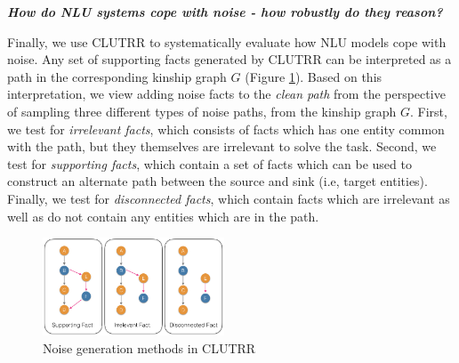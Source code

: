 \documentclass[12pt]{article}
\newcommand{\xhdr}[1]{{\noindent\bfseries #1}.}
\newcommand{\xit}[1]{{\noindent\textbf{\textit{#1}}}}
\begin{document}




\xit{How do NLU systems cope with noise - how robustly do they reason?}

Finally, we use CLUTRR to systematically evaluate how NLU models cope with noise.
Any set of supporting facts generated by CLUTRR can be interpreted as a path in the corresponding kinship graph $G$ (Figure \ref{fig:clutrr_data_noise}).
Based on this interpretation, we view adding noise facts to the \textit{clean path} from the perspective of sampling three different types of noise paths, from the kinship graph $G$. First, we test for \textit{irrelevant facts}, which consists of facts which has one entity common with the path, but they themselves are irrelevant to solve the task. Second, we test for \textit{supporting facts}, which contain a set of facts which can be used to construct an alternate path between the source and sink (i.e, target entities). Finally, we test for \textit{disconnected facts}, which contain facts which are irrelevant as well as do not contain any entities which are in the path.

\begin{figure}
\begin{center}
  \includegraphics[width=0.48\textwidth]{images/clutrr_noise.png}
\end{center}
\caption{Noise generation methods in CLUTRR}
\label{fig:clutrr_data_noise}
\end{figure}
\end{document}
